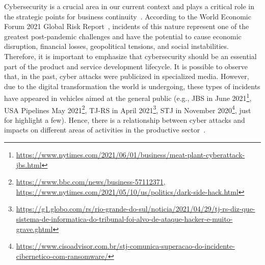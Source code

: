 




Cybersecurity is a crucial area in our current context and plays a critical role in the strategic points for business continuity~\cite{wef}. According to the World Economic Forum 2021 Global Risk Report~\cite{wefrep2021}, incidents of this nature represent one of the greatest post-pandemic challenges and have the potential to cause economic disruption, financial losses, geopolitical tensions, and social instabilities. Therefore, it is important to emphasize that cybersecurity should be an essential part of the product and service development lifecycle. It is possible to observe that, in the past, cyber attacks were publicized in specialized media. However, due to the digital transformation the world is undergoing, these types of incidents have appeared in vehicles aimed at the general public (e.g., JBS in June 2021\footnote{\url{https://www.nytimes.com/2021/06/01/business/meat-plant-cyberattack-jbs.html}}, USA Pipelines May 2021\footnote{\url{https://www.bbc.com/news/business-57112371}, \url{https://www.nytimes.com/2021/05/10/us/politics/dark-side-hack.html}}, TJ-RS in April 2021\footnote{\url{https://g1.globo.com/rs/rio-grande-do-sul/noticia/2021/04/29/tj-rs-diz-que-sistema-de-informatica-do-tribunal-foi-alvo-de-ataque-hacker-e-muito-grave.ghtml}}, STJ in November 2020\footnote{\url{https://www.cisoadvisor.com.br/stj-comunica-superacao-do-incidente-cibernetico-com-ransomware/}}, just for highlight a few). Hence, there is a relationship between cyber attacks and impacts on different areas of activities in the productive sector~\cite{costs}.

